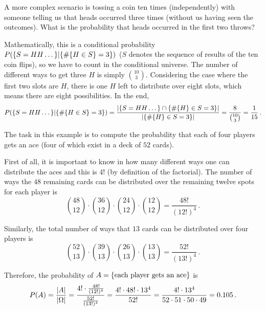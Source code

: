 \begin{ex}
A more complex scenario is tossing a coin ten times (independently) with someone telling us that heads occurred three times (without us having seen the outcomes). What is the probability that heads occurred in the first two throws?

Mathematically, this is a conditional probability $P\qty(\{S = HH \dots\} | \{\#\{H \in S\} = 3\})$ ($S$ denotes the sequence of results of the ten coin flips), so we have to count in the conditional universe. The number of different ways to get three $H$ is simply $\binom{10}{3}$. Considering the case where the first two slots are $H$, there is one $H$ left to distribute over eight slots, which means there are eight possibilities. In the end,
\begin{equation*}
P\qty(\{S = HH \dots\} | \{\#\{H \in S\} = 3\}) = \frac{\abs{\qty{S = HH \dots} \cap \qty{\#\qty{H} \in S = 3}}}{\abs{\qty{\#\qty{H} \in S = 3}}} = \frac{8}{\binom{10}{3}} = \frac{1}{15} \, .
\end{equation*}
\end{ex}


\begin{ex}
The task in this example is to compute the probability that each of four players gets an ace (four of which exist in a deck of $52$ cards).

First of all, it is important to  know in how many different ways one can distribute the aces and this is $4!$ (by definition of the factorial). The number of ways the $48$ remaining cards can be distributed over the remaining twelve spots for each player is
\begin{equation*}
\binom{48}{12} \cdot \binom{36}{12} \cdot \binom{24}{12} \cdot \binom{12}{12} = \frac{48!}{(12!)^4} \, .
\end{equation*}

Similarly, the total number of ways that $13$ cards can be distributed over four players is
\begin{equation*}
\binom{52}{13} \cdot \binom{39}{13} \cdot \binom{26}{13} \cdot \binom{13}{13} = \frac{52!}{(13!)^4} \, .
\end{equation*}

Therefore, the probability of $A = \qty{\text{each player gets an ace}}$ is
\begin{equation*}
P(A) = \frac{\abs{A}}{\abs{\Omega}} = \frac{4! \cdot \frac{48!}{(12!)^4}}{\frac{52!}{(13!)^4}} = \frac{4! \cdot 48! \cdot 13^4}{52!} = \frac{4! \cdot 13^4}{52 \cdot 51 \cdot 50 \cdot 49} = 0.105 \, .
\end{equation*}
\end{ex}



